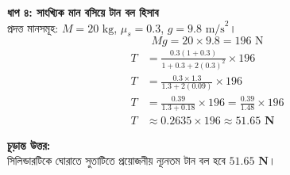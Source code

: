 \documentclass[12pt, a4paper]{article}
\begin{document}
\begin{tcolorbox}[solutionbox={সমাধান (Solution)}]
\vspace{0.5em}
\noindent
\textbf{ধাপ ৪: সাংখ্যিক মান বসিয়ে টান বল হিসাব} \\
প্রদত্ত মানসমূহ: $M = 20\text{ kg}$, $\mu_s = 0.3$, $g = 9.8\text{ m/s}^2$।
\[ Mg = 20 \times 9.8 = 196\text{ N} \]
\begin{align*}
    T &= \frac{0.3(1 + 0.3)}{1 + 0.3 + 2(0.3)^2} \times 196 \\
    T &= \frac{0.3 \times 1.3}{1.3 + 2(0.09)} \times 196 \\
    T &= \frac{0.39}{1.3 + 0.18} \times 196 = \frac{0.39}{1.48} \times 196 \\
    T &\approx 0.2635 \times 196 \approx \mathbf{51.65\text{ N}}
\end{align*}

\vspace{1em}
\begin{tcolorbox}[answerbox]
\textbf{চূড়ান্ত উত্তর:} \\
সিলিন্ডারটিকে ঘোরাতে সুতাটিতে প্রয়োজনীয় ন্যূনতম টান বল হবে $\mathbf{51.65\text{ N}}$।
\end{tcolorbox}
\end{tcolorbox}
\end{document}
